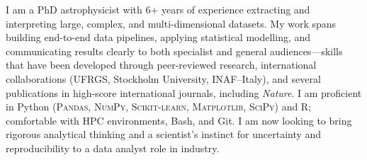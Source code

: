 \vspace{-2em}

\begin{flushleft}
I am a PhD astrophysicist with 6+ years of experience extracting and interpreting large, complex, and multi-dimensional datasets. My work spans building end-to-end data pipelines, applying statistical modelling, and communicating results clearly to both specialist and general audiences---skills that have been developed through peer-reviewed research, international collaborations (UFRGS, Stockholm University, INAF--Italy), and several publications in high-score international journals, including \textit{Nature}. I am proficient in Python (\textsc{Pandas}, \textsc{NumPy}, \textsc{Scikit-learn}, \textsc{Matplotlib}, \textsc{SciPy}) and R; comfortable with HPC environments, Bash, and Git. I am now looking to bring rigorous analytical thinking and a scientist's instinct for uncertainty and reproducibility to a data analyst role in industry.
\end{flushleft}
